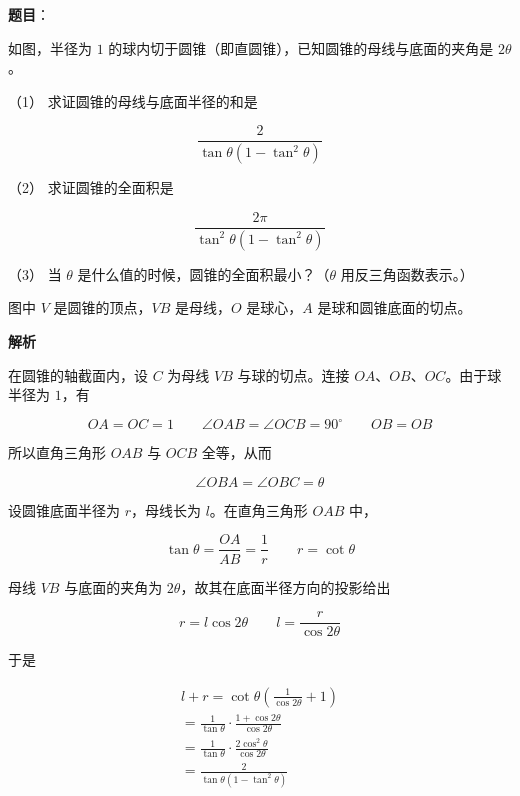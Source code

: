 \begin{answer}

\textbf{题目}：

如图，半径为 $1$ 的球内切于圆锥（即直圆锥），已知圆锥的母线与底面的夹角是 $2\theta$。

（1） 求证圆锥的母线与底面半径的和是

\nopagebreak[4]
\[
\frac{2}{\tan\theta\left(1-\tan^2\theta\right)}
\]

（2） 求证圆锥的全面积是

\nopagebreak[4]
\[
\frac{2\pi}{\tan^2\theta\left(1-\tan^2\theta\right)}
\]

（3） 当 $\theta$ 是什么值的时候，圆锥的全面积最小？（$\theta$ 用反三角函数表示。）

图中 $V$ 是圆锥的顶点，$VB$ 是母线，$O$ 是球心，$A$ 是球和圆锥底面的切点。
\nopagebreak[4]
\begin{center}\end{center}
\nopagebreak[4]
\textbf{解析}


在圆锥的轴截面内，设 $C$ 为母线 $VB$ 与球的切点。连接 $OA\text{、}OB\text{、}OC$。由于球半径为 $1$，有

\nopagebreak[4]
\[
OA=OC=1\qquad \angle OAB=\angle OCB=90^\circ\qquad OB=OB
\]

所以直角三角形 $OAB$ 与 $OCB$ 全等，从而

\nopagebreak[4]
\[
\angle OBA=\angle OBC=\theta
\]

设圆锥底面半径为 $r$，母线长为 $l$。在直角三角形 $OAB$ 中，

\nopagebreak[4]
\[
\tan\theta=\frac{OA}{AB}=\frac1r
\qquad r=\cot\theta
\]

母线 $VB$ 与底面的夹角为 $2\theta$，故其在底面半径方向的投影给出

\nopagebreak[4]
\[
r=l\cos2\theta
\qquad l=\frac{r}{\cos2\theta}
\]

于是

\nopagebreak[4]
\[
\begin{gathered}
l+r=\cot\theta\left(\frac1{\cos2\theta}+1\right)\\
=\frac1{\tan\theta}\cdot\frac{1+\cos2\theta}{\cos2\theta}\\
=\frac1{\tan\theta}\cdot\frac{2\cos^2\theta}{\cos2\theta}\\
=\frac{2}{\tan\theta\left(1-\tan^2\theta\right)}
\end{gathered}
\]


\end{answer}
